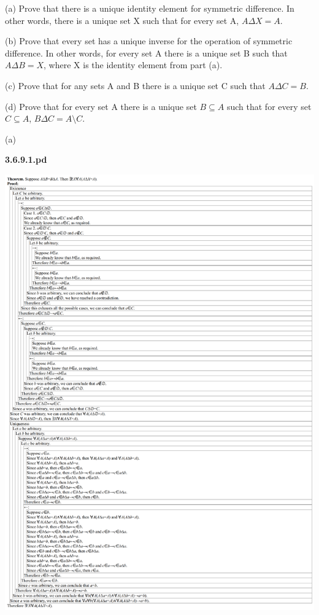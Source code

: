 \documentclass{article}
\begin{document}
\hspace{12pt}(a) Prove that there is a unique identity element for symmetric difference.
In other words, there is a unique set X such that for every set
A, $A \Delta X = A$.

\hspace{12pt}(b) Prove that every set has a unique inverse for the operation of symmetric
difference. In other words, for every set A there is a unique set B
such that $A \Delta B = X$, where X is the identity element from part (a).

\hspace{12pt}(c) Prove that for any sets A and B there is a unique set C such that
$A \Delta C = B$.

\hspace{12pt}(d) Prove that for every set A there is a unique set $B \subseteq A$ such that for
every set $C \subseteq A$, $B \Delta C = A \setminus C$.

\vspace{30pt}

(a)

\textbf{3.6.9.1.pd}
\vspace{10pt}

\includegraphics[width=\textwidth,height=\textheight,keepaspectratio]{3_6_9_1}
\end{document}
